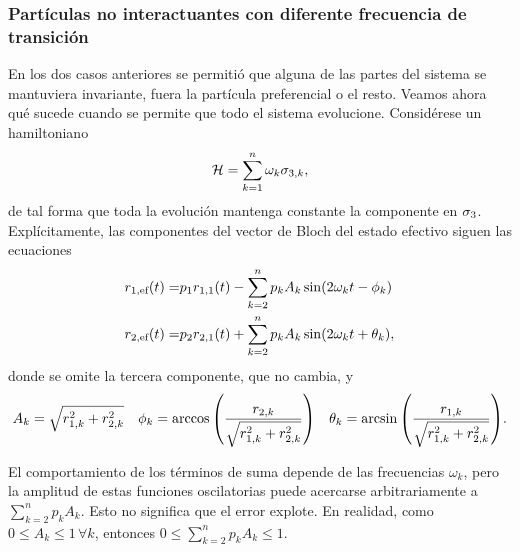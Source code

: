 \subsubsection{Partículas no interactuantes con diferente frecuencia de transición}

En los dos casos anteriores se permitió que alguna de las partes del sistema se mantuviera invariante, fuera la partícula preferencial o el resto. Veamos ahora qué sucede cuando se permite que todo el sistema evolucione. Considérese un hamiltoniano
\begin{equation}
    \mathcal{H}=\sum_{k=1}^{n}\omega_{k}\sigma_{3,k},\nonumber
\end{equation}
de tal forma que toda la evolución mantenga constante la componente en $\sigma_{3}$. Explícitamente, las componentes del vector de Bloch del estado efectivo siguen las ecuaciones
\begin{align}
    r_{1,\text{ef}}(t)=&p_{1}r_{1,1}(t)-\sum_{k=2}^{n}p_{k}A_{k}\sin(2\omega_{k} t-\phi_{k})\nonumber\\
    r_{2,\text{ef}}(t)=&p_{2}r_{2,1}(t)+\sum_{k=2}^{n}p_{k}A_{k}\sin(2\omega_{k} t+\theta_{k}),\nonumber
\end{align}
donde se omite la tercera componente, que no cambia, y
\begin{align}
    A_{k}=\sqrt{r_{1,k}^{2}+r_{2,k}^{2}} & & \phi_{k}=\arccos\qty(\frac{r_{2,k}}{\sqrt{r_{1,k}^{2}+r_{2,k}^{2}}}) & & \theta_{k}=\arcsin\qty(\frac{r_{1,k}}{\sqrt{r_{1,k}^{2}+r_{2,k}^{2}}}).\nonumber
\end{align}

El comportamiento de los términos de suma depende de las frecuencias $\omega_{k}$, pero la amplitud de estas funciones oscilatorias puede acercarse arbitrariamente a $\sum_{k=2}^{n} p_{k} A_{k}$. Esto no significa que el error explote. En realidad, como $0\leq A_{k}\leq 1\,\forall k$, entonces $0\leq\sum_{k=2}^{n} p_{k} A_{k}\leq 1$. 


